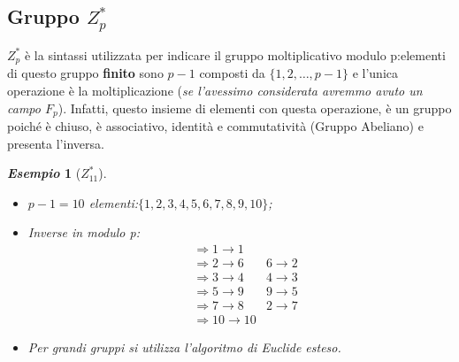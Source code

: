\documentclass{book}
\newtheorem{esempio}{\emph{Esempio}}
\begin{document}
\subsection{Gruppo \(Z_{p}^{*}\)}
\(Z_{p}^{*}\) è la sintassi utilizzata per indicare il gruppo moltiplicativo modulo p:\@gli elementi di questo gruppo \textbf{finito} sono \(p-1\) composti da \( \{ 1,2,\ldots,p-1\} \) e l'unica operazione è la moltiplicazione (\emph{se l'avessimo considerata avremmo avuto un campo \(F_{p}\)})\@.\newline
Infatti, questo insieme di elementi con questa operazione, è un gruppo poiché è chiuso, è associativo, identità e commutatività (Gruppo Abeliano) e presenta l'inversa\@.
\begin{esempio}[\(Z_{11}^{*}\)]
    \begin{itemize}
        \item \(p-1=10\) elementi:\( \{1,2,3,4,5,6,7,8,9,10 \} \);
        \item Inverse in modulo p:\begin{align*}
                   & \Rightarrow 1\rightarrow 1                        \\
                   & \Rightarrow 2\rightarrow 6\quad & 6 \rightarrow 2 \\
                   & \Rightarrow 3\rightarrow 4\quad & 4 \rightarrow 3 \\
                   & \Rightarrow 5\rightarrow 9\quad & 9 \rightarrow 5 \\
                   & \Rightarrow 7\rightarrow 8\quad & 2 \rightarrow 7 \\
                   & \Rightarrow 10\rightarrow 10
              \end{align*}
        \item Per grandi gruppi si utilizza l'algoritmo di Euclide esteso.
    \end{itemize}
\end{esempio}
\end{document}
